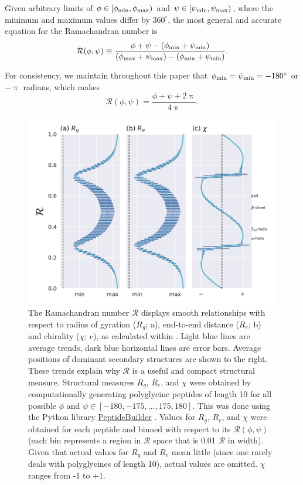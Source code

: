 \documentclass[fleqn,10pt,lineno]{wlpeerj} %
\newcommand{\n}[1]{{\color{red}#1}}
\newcommand{\rr}{$\mathcal{R}$\xspace}
\begin{document}

Given arbitrary limits of $\phi \in [\phi_{\rm min},\phi_{\rm max})$ and $\psi \in [\psi_{\rm min},\psi_{\rm max})$, where the minimum and maximum values differ by $360^\circ$, the most general and accurate equation for the Ramachandran number is
\begin{equation}
{\mathcal{R}}(\phi,\psi) \equiv  \frac{\phi+\psi-(\phi_{\rm min}+\psi_{\rm min})}{(\phi_{\rm max}+\psi_{\rm max})-(\phi_{\rm min}+\psi_{\rm min})}.
\label{ramaGeneral}
\end{equation}

For consistency, we maintain throughout this paper that $\phi_{\rm min} = \psi_{\rm min} = -180^\circ$ or $-\uppi$ radians, which makes 
\begin{equation}
\mathcal{R}(\phi,\psi) = \frac{\phi+\psi+2\uppi}{4\uppi}.\label{eqn:rama}
\end{equation}

\begin{figure}[t!]
\begin{adjustwidth}{-1in}{0in} %
\centering
\includegraphics[width=0.6\linewidth]{automated_figures/fig_r_intro.pdf}
\caption{The Ramachandran number \rr displays smooth relationships with respect to radius of gyration ($R_g$; a), end-to-end distance ($R_e$; b) and chirality ($\chi$; c), as calculated within \cite{Mannige2017}. Light blue lines are average trends, dark blue horizontal lines are error bars. Average positions of dominant secondary structures are shown to the right. These trends explain why \rr is a useful and compact structural measure. Structural measures $R_g$, $R_e$\n{, and $\chi$} were obtained by computationally generating polyglycine peptides of length 10 for all possible $\phi$ and $\psi \in [-180,-175,\ldots,175,180]$. This was done using the Python library \href{https://github.com/mtien/PeptideBuilder}{PeptideBuilder} \citep{Tien2013}. Values for $R_g$, $R_e$\n{, and $\chi$} were obtained for each peptide and binned with respect to its {$\mathcal{R}(\phi,\psi)$} (each bin represents a region in \rr space that is 0.01 \rr in width). Given that actual values for $R_g$ and $R_e$ mean little (since one rarely deals with polyglycines of length 10), actual values are omitted. \n{$\chi$ ranges from -1 to +1.} \label{fig:r_smooth}} 
\end{adjustwidth}
\end{figure}
\end{document}
